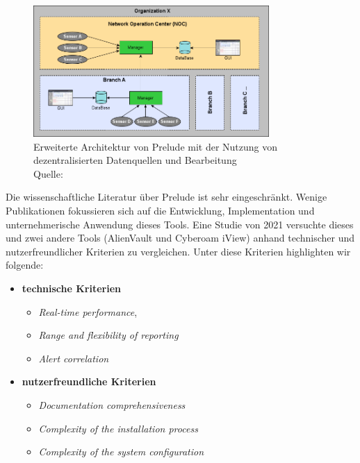\begin{figure}[H]
   \centering
   \includegraphics[width=0.8\textwidth]{assets/2_p5.png}
   \caption{Erweiterte Architektur von Prelude mit der Nutzung von dezentralisierten
   Datenquellen und Bearbeitung\\Quelle: \citep{Prelude_MU} }
   \centering
\end{figure}

Die wissenschaftliche Literatur über Prelude ist sehr eingeschränkt. Wenige Publikationen fokussieren sich auf die Entwicklung, Implementation und unternehmerische Anwendung dieses Tools. Eine Studie von 2021 versuchte dieses und zwei andere Tools (AlienVault und Cyberoam iView) anhand technischer und nutzerfreundlicher Kriterien zu vergleichen. Unter diese Kriterien highlighten wir folgende\citep{Grammatikis_Prelude}: 

\begin{itemize}[noitemsep]
   \item \textbf{technische Kriterien}
   \begin{itemize}[noitemsep]
      \item \textit{Real-time performance}, 
      \item \textit{Range and flexibility of reporting}
      \item \textit{Alert correlation}
   \end{itemize}

   \item \textbf{nutzerfreundliche Kriterien}
   \begin{itemize}[noitemsep]
      \item \textit{Documentation comprehensiveness}
      \item \textit{Complexity of the installation process}
      \item \textit{Complexity of the system configuration}
   \end{itemize}
\end{itemize}

